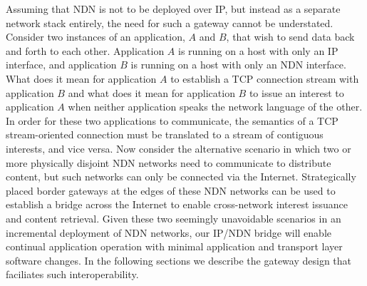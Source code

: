 Assuming that NDN is not to be deployed over IP, but instead as a separate network stack entirely, the need for such a gateway cannot be understated. Consider two instances of an application, $A$ and $B$, that wish to send data back and forth to each other. Application $A$ is running on a host with only an IP interface, and application $B$ is running on a host with only an NDN interface. What does it mean for application $A$ to establish a TCP connection stream with application $B$ and what does it mean for application $B$ to issue an interest to application $A$ when neither application speaks the network language of the other. In order for these two applications to communicate, the semantics of a TCP stream-oriented connection must be translated to a stream of contiguous interests, and vice versa. Now consider the alternative scenario in which two or more physically disjoint NDN networks need to communicate to distribute content, but such networks can only be connected via the Internet. Strategically placed border gateways at the edges of these NDN networks can be used to establish a bridge across the Internet to enable cross-network interest issuance and content retrieval. Given these two seemingly unavoidable scenarios in an incremental deployment of NDN networks, our IP/NDN bridge will enable continual application operation with minimal application and transport layer software changes. In the following sections we describe the gateway design that faciliates such interoperability.




